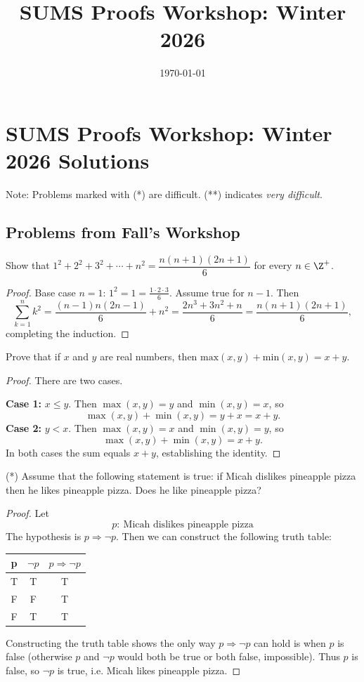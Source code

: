 \documentclass[12pt]{article}
\title{SUMS Proofs Workshop: Winter 2026}
\author{}
\date{\today}
\begin{document}
\section*{SUMS Proofs Workshop: Winter 2026 Solutions}

Note: Problems marked with (*) are difficult. (**) indicates \textit{very difficult}.

\subsection*{Problems from Fall's Workshop}

\begin{problem}
Show that $1^2+2^2+3^2+\cdots+n^2 = \dfrac{n(n+1)(2n+1)}{6}$ for every $n \in \Z^+$.

\begin{proof}
Base case $n=1$: $1^2 = 1 = \frac{1\cdot2\cdot3}{6}$. Assume true for $n-1$. Then
\[
    \sum_{k=1}^n k^2 = \frac{(n-1)n(2n-1)}{6} + n^2
    = \frac{2n^3+3n^2+n}{6} = \frac{n(n+1)(2n+1)}{6},
\]
completing the induction.
\end{proof}
\end{problem}

\begin{problem}
Prove that if $x$ and $y$ are real numbers, then $\text{max}(x, y) + \text{min}(x, y) = x + y$.

\begin{proof}
There are two cases.

\textbf{Case 1:} \(x\le y\).  
Then \(\max(x,y)=y\) and \(\min(x,y)=x\), so
\[
\max(x,y)+\min(x,y)=y+x=x+y.
\]
\textbf{Case 2:} \(y< x\).  
Then \(\max(x,y)=x\) and \(\min(x,y)=y\), so
\[
\max(x,y)+\min(x,y)=x+y.
\]
In both cases the sum equals \(x+y\), establishing the identity.
\end{proof}    
\end{problem}

\begin{problem}
(*) Assume that the following statement is true: if Micah dislikes pineapple pizza then he likes pineapple pizza. Does he like pineapple pizza?

\begin{proof}
Let
\[
    p:\ \text{Micah dislikes pineapple pizza}
\]
The hypothesis is $p\Rightarrow \neg p$. Then we can construct the following truth table:
\begin{center}
    \begin{tabular}{c | c | c }
        p & $\lnot p$ & $p \Rightarrow \lnot p$ \\
        \hline
        T & T & T \\
        F & F & T \\
        F & T & T
    \end{tabular}
\end{center}


Constructing the truth table shows the only way $p\Rightarrow \neg p$ can hold is when $p$ is false (otherwise $p$ and $\neg p$ would both be true or both false, impossible). Thus $p$ is false, so $\neg p$ is true, i.e. Micah likes pineapple pizza.
\end{proof}
\end{problem}
\end{document}

